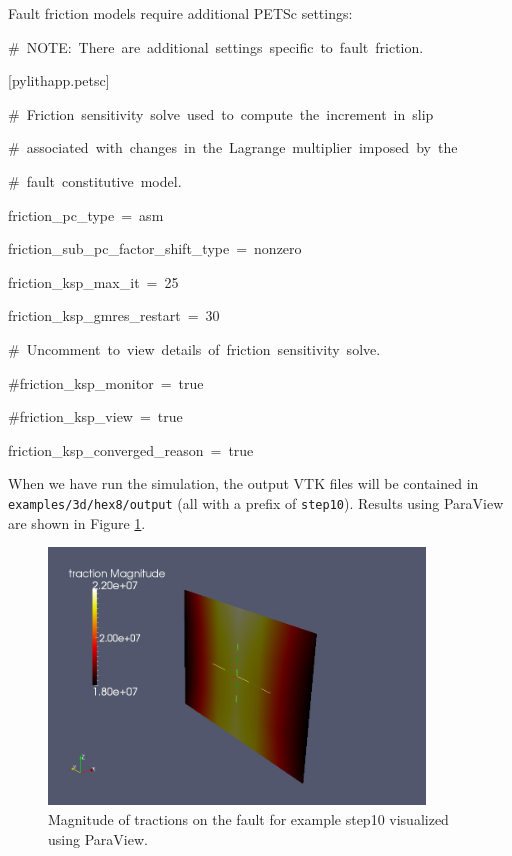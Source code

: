 Fault friction models require additional PETSc settings:
\begin{lyxcode}
\#~NOTE:~There~are~additional~settings~specific~to~fault~friction.

{[}pylithapp.petsc{]}

\#~Friction~sensitivity~solve~used~to~compute~the~increment~in~slip

\#~associated~with~changes~in~the~Lagrange~multiplier~imposed~by~the

\#~fault~constitutive~model.

friction\_pc\_type~=~asm

friction\_sub\_pc\_factor\_shift\_type~=~nonzero

friction\_ksp\_max\_it~=~25

friction\_ksp\_gmres\_restart~=~30

\#~Uncomment~to~view~details~of~friction~sensitivity~solve.

\#friction\_ksp\_monitor~=~true

\#friction\_ksp\_view~=~true

friction\_ksp\_converged\_reason~=~true


\end{lyxcode}
When we have run the simulation, the output VTK files will be contained
in \texttt{examples/3d/hex8/output} (all with a prefix of \texttt{step10}).
Results using ParaView are shown in Figure \ref{fig:step10-fault-traction-slip}.

\begin{figure}
\begin{centering}
\includegraphics[width=10cm]{tutorials/3dhex8/figs/step10-fault-traction-slip}
\par\end{centering}

\caption{Magnitude of tractions on the fault for example step10 visualized
using ParaView. \label{fig:step10-fault-traction-slip}}
\end{figure}



